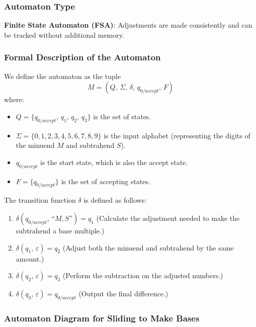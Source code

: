 \documentclass[11pt]{article}
\begin{document}
\subsubsection*{Automaton Type}
\textbf{Finite State Automaton (FSA)}: Adjustments are made consistently and can be tracked without additional memory.

\subsubsection*{Formal Description of the Automaton}

We define the automaton as the tuple
\[
M = (Q,\,\Sigma,\,\delta,\,q_{0/accept},\,F)
\]
where:
\begin{itemize}
    \item \(Q = \{q_{0/accept},\, q_1,\, q_2,\, q_3\}\) is the set of states.
    \item \(\Sigma = \{0,1,2,3,4,5,6,7,8,9\}\) is the input alphabet (representing the digits of the minuend \(M\) and subtrahend \(S\)).
    \item \(q_{0/accept}\) is the start state, which is also the accept state.
    \item \(F = \{q_{0/accept}\}\) is the set of accepting states.
\end{itemize}

The transition function \(\delta\) is defined as follows:
\begin{enumerate}
    \item \(\delta(q_{0/accept},\, \text{``}M,S\text{''}) = q_1\) \quad (Calculate the adjustment needed to make the subtrahend a base multiple.)
    \item \(\delta(q_1,\, \varepsilon) = q_2\) \quad (Adjust both the minuend and subtrahend by the same amount.)
    \item \(\delta(q_2,\, \varepsilon) = q_3\) \quad (Perform the subtraction on the adjusted numbers.)
    \item \(\delta(q_3,\, \varepsilon) = q_{0/accept}\) \quad (Output the final difference.)
\end{enumerate}

\subsubsection*{Automaton Diagram for Sliding to Make Bases}
\end{document}
